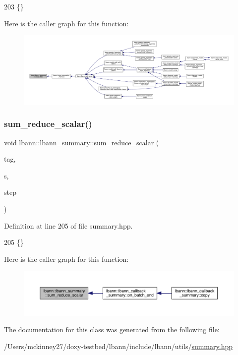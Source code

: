\begin{DoxyCode}
203 \{\}
\end{DoxyCode}
Here is the caller graph for this function\+:\nopagebreak
\begin{figure}[H]
\begin{center}
\leavevmode
\includegraphics[width=350pt]{classlbann_1_1lbann__summary_a65475f9a72f042b6ba09a2d33fda9293_icgraph}
\end{center}
\end{figure}
\mbox{\label{classlbann_1_1lbann__summary_a61dadb797450bca910d3673e03be95e0}} 
\subsubsection{\texorpdfstring{sum\+\_\+reduce\+\_\+scalar()}{sum\_reduce\_scalar()}}
{\footnotesize\ttfamily void lbann\+::lbann\+\_\+summary\+::sum\+\_\+reduce\+\_\+scalar (\begin{DoxyParamCaption}\item[{const std\+::string}]{tag,  }\item[{Data\+Type}]{s,  }\item[{int}]{step }\end{DoxyParamCaption})\hspace{0.3cm}{\ttfamily [inline]}}



Definition at line 205 of file summary.\+hpp.


\begin{DoxyCode}
205 \{\}
\end{DoxyCode}
Here is the caller graph for this function\+:\nopagebreak
\begin{figure}[H]
\begin{center}
\leavevmode
\includegraphics[width=350pt]{classlbann_1_1lbann__summary_a61dadb797450bca910d3673e03be95e0_icgraph}
\end{center}
\end{figure}


The documentation for this class was generated from the following file\+:\begin{DoxyCompactItemize}
\item 
/\+Users/mckinney27/doxy-\/testbed/lbann/include/lbann/utils/\hyperlink{summary_8hpp}{summary.\+hpp}\end{DoxyCompactItemize}
